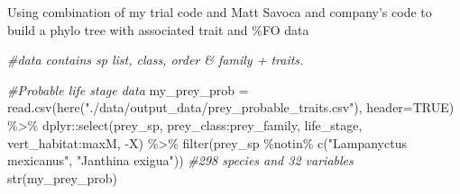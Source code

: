 \documentclass[
]{article}
\newenvironment{Shaded}{\begin{snugshade}}{\end{snugshade}}
\newcommand{\AttributeTok}[1]{\textcolor[rgb]{0.77,0.63,0.00}{#1}}
\newcommand{\CommentTok}[1]{\textcolor[rgb]{0.56,0.35,0.01}{\textit{#1}}}
\newcommand{\ConstantTok}[1]{\textcolor[rgb]{0.00,0.00,0.00}{#1}}
\newcommand{\FunctionTok}[1]{\textcolor[rgb]{0.00,0.00,0.00}{#1}}
\newcommand{\NormalTok}[1]{#1}
\newcommand{\OtherTok}[1]{\textcolor[rgb]{0.56,0.35,0.01}{#1}}
\newcommand{\SpecialCharTok}[1]{\textcolor[rgb]{0.00,0.00,0.00}{#1}}
\newcommand{\StringTok}[1]{\textcolor[rgb]{0.31,0.60,0.02}{#1}}
\begin{document}
Using combination of my trial code and Matt Savoca and company's code to
build a phylo tree with associated trait and \%FO data

\begin{Shaded}
\begin{Highlighting}[]
\CommentTok{\#data contains sp list, class, order \& family + traits.}

\CommentTok{\#Probable life stage data}
\NormalTok{my\_prey\_prob }\OtherTok{=} \FunctionTok{read.csv}\NormalTok{(}\FunctionTok{here}\NormalTok{(}\StringTok{"./data/output\_data/prey\_probable\_traits.csv"}\NormalTok{), }\AttributeTok{header=}\ConstantTok{TRUE}\NormalTok{) }\SpecialCharTok{\%\textgreater{}\%}
\NormalTok{  dplyr}\SpecialCharTok{::}\FunctionTok{select}\NormalTok{(prey\_sp, prey\_class}\SpecialCharTok{:}\NormalTok{prey\_family, life\_stage, vert\_habitat}\SpecialCharTok{:}\NormalTok{maxM, }\SpecialCharTok{{-}}\NormalTok{X) }\SpecialCharTok{\%\textgreater{}\%}
  \FunctionTok{filter}\NormalTok{(prey\_sp }\SpecialCharTok{\%notin\%} \FunctionTok{c}\NormalTok{(}\StringTok{"Lampanyctus mexicanus"}\NormalTok{, }\StringTok{"Janthina exigua"}\NormalTok{))}
\CommentTok{\#298 species and 32 variables}
\FunctionTok{str}\NormalTok{(my\_prey\_prob)}
\end{Highlighting}
\end{Shaded}
\end{document}
